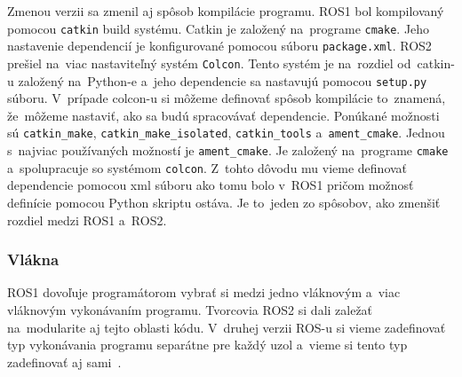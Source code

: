 	Zmenou verzii sa zmenil aj spôsob kompilácie programu. ROS1 bol kompilovaný pomocou \texttt{catkin} build systému. Catkin je založený
	na~programe \texttt{cmake}. Jeho nastavenie dependencií je konfigurované pomocou súboru \texttt{package.xml}. ROS2 prešiel na~viac
	nastaviteľný systém \texttt{Colcon}. Tento systém je na~rozdiel od~catkin-u založený na~Python-e a~jeho dependencie sa nastavujú pomocou
	\texttt{setup.py} súboru. V~prípade colcon-u si môžeme definovať spôsob kompilácie to~znamená, že~môžeme nastaviť, ako sa budú spracovávať
	dependencie. Ponúkané možnosti sú \texttt{catkin\_make}, \texttt{catkin\_make\_isolated}, \texttt{catkin\_tools} a~\texttt{ament\_cmake}.
	Jednou s~najviac používaných možností je \texttt{ament\_cmake}. Je založený na~programe \texttt{cmake} a~spolupracuje so systémom \texttt{colcon}.
	Z~tohto dôvodu mu vieme definovať dependencie pomocou xml súboru ako tomu bolo v~ROS1 pričom možnosť definície pomocou Python skriptu ostáva.
	Je to~jeden zo spôsobov, ako zmenšiť rozdiel medzi ROS1 a~ROS2.

\subsubsection{Vlákna}

	ROS1 dovoľuje programátorom vybrať si medzi jedno vláknovým a~viac vláknovým vykonávaním programu. Tvorcovia ROS2 si dali zaležať na~modularite
	aj tejto oblasti kódu. V~druhej verzii ROS-u si vieme zadefinovať typ vykonávania programu separátne pre každý uzol a~vieme si tento typ
	zadefinovať aj sami~\cite{ROS2design}.


